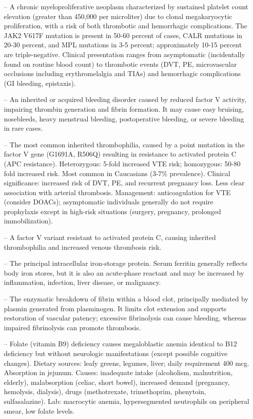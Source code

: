 -- A chronic myeloproliferative neoplasm characterized by sustained platelet count elevation (greater than 450,000 per microliter) due to clonal megakaryocytic proliferation, with a risk of both thrombotic and hemorrhagic complications. The JAK2 V617F mutation is present in 50-60 percent of cases, CALR mutations in 20-30 percent, and MPL mutations in 3-5 percent; approximately 10-15 percent are triple-negative. Clinical presentation ranges from asymptomatic (incidentally found on routine blood count) to thrombotic events (DVT, PE, microvascular occlusions including erythromelalgia and TIAs) and hemorrhagic complications (GI bleeding, epistaxis).

-- An inherited or acquired bleeding disorder caused by reduced factor V activity, impairing thrombin generation and fibrin formation. It may cause easy bruising, nosebleeds, heavy menstrual bleeding, postoperative bleeding, or severe bleeding in rare cases.

-- The most common inherited thrombophilia, caused by a point mutation in the factor V gene (G1691A, R506Q) resulting in resistance to activated protein C (APC resistance). Heterozygous: 5-fold increased VTE risk; homozygous: 50-80 fold increased risk. Most common in Caucasians (3-7\% prevalence). Clinical significance: increased risk of DVT, PE, and recurrent pregnancy loss. Less clear association with arterial thrombosis. Management: anticoagulation for VTE (consider DOACs); asymptomatic individuals generally do not require prophylaxis except in high-risk situations (surgery, pregnancy, prolonged immobilization).

-- A factor V variant resistant to activated protein C, causing inherited thrombophilia and increased venous thrombosis risk.

-- The principal intracellular iron-storage protein. Serum ferritin generally reflects body iron stores, but it is also an acute-phase reactant and may be increased by inflammation, infection, liver disease, or malignancy.

-- The enzymatic breakdown of fibrin within a blood clot, principally mediated by plasmin generated from plasminogen. It limits clot extension and supports restoration of vascular patency; excessive fibrinolysis can cause bleeding, whereas impaired fibrinolysis can promote thrombosis.

-- Folate (vitamin B9) deficiency causes megaloblastic anemia identical to B12 deficiency but without neurologic manifestations (except possible cognitive changes). Dietary sources: leafy greens, legumes, liver; daily requirement 400 mcg. Absorption in jejunum. Causes: inadequate intake (alcoholism, malnutrition, elderly), malabsorption (celiac, short bowel), increased demand (pregnancy, hemolysis, dialysis), drugs (methotrexate, trimethoprim, phenytoin, sulfasalazine). Lab: macrocytic anemia, hypersegmented neutrophils on peripheral smear, low folate levels.


